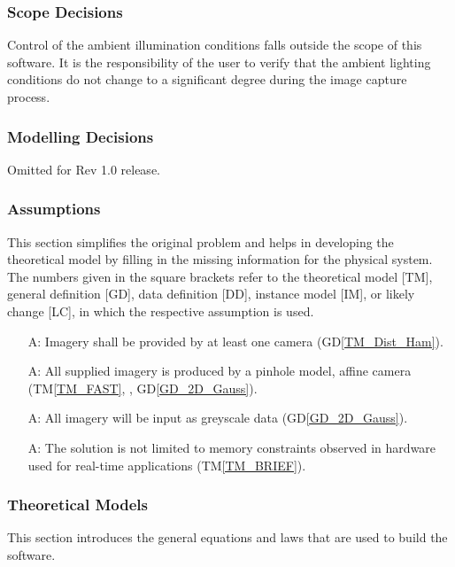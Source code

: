 \documentclass[12pt]{article}
\newcommand{\dref}[1]{GD\ref{#1}}
\newcommand{\tref}[1]{TM\ref{#1}}
\newcounter{assumpnum} %
\begin{document}
\subsubsection{Scope Decisions}
Control of the ambient illumination conditions falls outside the scope of this software.
It is the responsibility of the user to verify that the ambient lighting conditions do 
not change to a significant degree during the image capture process.


\subsubsection{Modelling Decisions}
Omitted for Rev 1.0 release.

\subsubsection{Assumptions} \label{sec_assumpt}
This section simplifies the original problem and helps in developing the
theoretical model by filling in the missing information for the physical system.
The numbers given in the square brackets refer to the theoretical model [TM],
general definition [GD], data definition [DD], instance model [IM], or likely
change [LC], in which the respective assumption is used.

\begin{itemize}
\item[A\refstepcounter{assumpnum}\theassumpnum \label{A_min_num_cameras}:]
Imagery shall be provided by at least one camera (\dref{TM_Dist_Ham}).

\item[A\refstepcounter{assumpnum}\theassumpnum \label{A_camera_model}:]
All supplied imagery is produced by a pinhole model, affine camera 
(\tref{TM_FAST}, , \dref{GD_2D_Gauss}).

\item[A\refstepcounter{assumpnum}\theassumpnum \label{A_greyscale}:]
All imagery will be input as greyscale data (\dref{GD_2D_Gauss}).

\item[A\refstepcounter{assumpnum}\theassumpnum \label{A_RT_Memory}:]
The solution is not limited to memory constraints observed in hardware used for real-time 
applications (\tref{TM_BRIEF}).

\end{itemize}

\subsubsection{Theoretical Models}\label{sec_theoretical}
This section introduces the general equations and laws that are used to build the 
\progname{} software.
\end{document}
